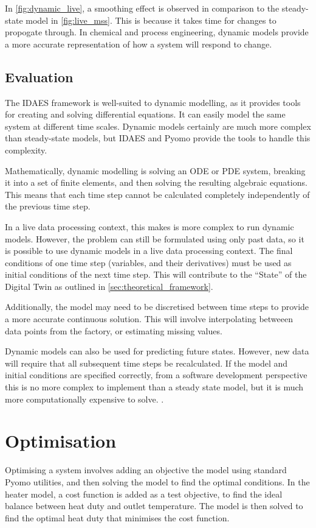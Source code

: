 \documentclass[12pt]{article}
\begin{document}
In \cref{fig:dynamic_live}, a smoothing effect is observed in comparison to the steady-state model in \cref{fig:live_mss}. This is because it takes time for changes to propogate through. In chemical and process engineering, dynamic models provide a more accurate representation of how a system will respond to change. \cite{CITATION_NEEDED}


\subsection{Evaluation}
The IDAES framework is well-suited to dynamic modelling, as it provides tools for creating and solving differential equations. It can easily model the same system at different time scales. Dynamic models certainly are much more complex than steady-state models, but IDAES and Pyomo provide the tools to handle this complexity.

Mathematically, dynamic modelling is solving an ODE or PDE system, breaking it into a set of finite elements, and then solving the resulting algebraic equations. This means that each time step cannot be calculated completely independently of the previous time step.

In a live data processing context, this makes is more complex to run dynamic models. 
However, the problem can still be formulated using only past data, so it is possible to use dynamic models in a live data processing context.
The final conditions of one time step (variables, and their derivatives) must be used as initial conditions of the next time step. This will contribute to the ``State'' of the Digital Twin as outlined in \cref{sec:theoretical_framework}.

Additionally, the model may need to be discretised between time steps to provide a more accurate continuous solution. This will involve interpolating betweeen data points from the factory, or estimating missing values.


Dynamic models can also be used for predicting future states. However, new data will require that all subsequent time steps be recalculated. 
If the model and initial conditions are specified correctly, from a software development perspective this is no more complex to implement than a steady state model, but it is much more computationally expensive to solve. 
.

\section{Optimisation}
Optimising a system involves adding an objective the model using standard Pyomo utilities, and then solving the model to find the optimal conditions. In the heater model, a cost function is added as a test objective, to find the ideal balance between heat duty and outlet temperature. The model is then solved to find the optimal heat duty that minimises the cost function.
\end{document}
